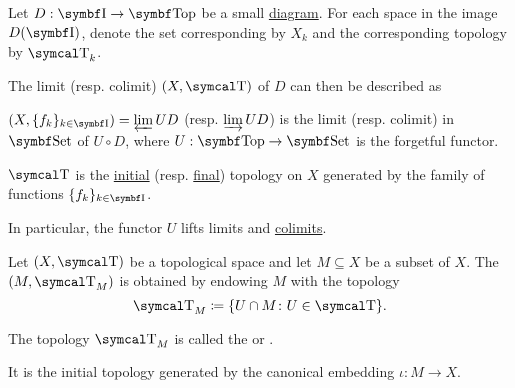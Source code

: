 \begin{proposition}\label{thm:initial_final_topology_limit}
  Let \( D: \Bold I \to \Cat{Top} \) be a small \hyperref[def:categorical_diagram]{diagram}. For each space in the image \( D(\Bold I) \), denote the set corresponding by \( X_k \) and the corresponding topology by \( \CT_k \).

  The limit (resp. colimit) \( (X, \CT) \) of \( D \) can then be described as
  \begin{DefEnum}
    \item \( (X, \{ f_k \}_{k \in \Cat{I}}) = \varprojlim UD \) (resp. \( \varinjlim UD \)) is the limit (resp. colimit) in \( \Cat{Set} \) of \( U \circ D \), where \( U: \Bold{Top} \to \Cat{Set} \) is the forgetful functor.
    \item \( \CT \) is the \hyperref[def:initial_topology]{initial} (resp. \hyperref[def:final_topology]{final}) topology on \( X \) generated by the family of functions \( \{ f_k \}_{k \in \Cat{I}} \).
  \end{DefEnum}

  In particular, the functor \( U \) lifts limits and \hyperref[def:categorical_limit_preservation/lift]{colimits}.
\end{proposition}

\begin{definition}\label{def:topological_subspace}
  Let \( (X, \CT) \) be a topological space and let \( M \subseteq X \) be a subset of \( X \). The  \( (M, \CT_M) \) is obtained by endowing \( M \) with the topology
  \begin{equation*}
    \CT_M \coloneqq \{ U \cap M \colon U \in \CT \}.
  \end{equation*}

  The topology \( \CT_M \) is called the  or .

  It is the initial topology generated by the canonical embedding \( \iota: M \to X \).
\end{definition}

